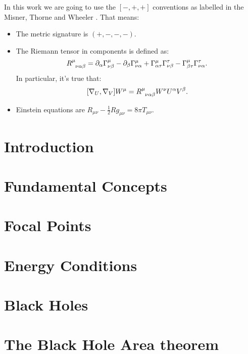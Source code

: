 \documentclass[12pt, a4paper]{book}
\begin{document}
In this work we are going to use the \([-, + , +]\) conventions as labelled in the Misner, Thorne and Wheeler \cite{misner1973gravitation}. That means:
\begin{itemize}
	\item[\ding{99}] The metric signature is \((+, -, -, -)\).
	\item[\ding{99}]  The Riemann tensor in components is defined as:
	\[
	R\indices{^{\mu}_{\nu\alpha\beta}} = \partial_{\alpha}\Gamma^{\mu}_{\nu\beta} - \partial_{\beta}\Gamma^{\mu}_{\nu\alpha} + \Gamma^{\mu}_{\alpha\tau}\Gamma^{\tau}_{\nu\beta} - \Gamma^{\mu}_{\beta\tau}\Gamma^{\tau}_{\nu\alpha}.
	\]
	In particular, it's true that:
	\[
	[\nabla_U, \nabla_V] W^{\mu} = R\indices{^{\mu}_{\nu\alpha\beta}}W^{\nu}U^{\alpha}V^{\beta}.
	\]
	\item[\ding{99}]  Einstein equations are \(R_{\mu\nu} - \frac{1}{2}Rg_{\mu\nu} = 8\pi T_{\mu\nu}\).
\end{itemize}

\chapter*{Introduction}


\chapter{Fundamental Concepts}


\chapter{Focal Points}
\label{ch:focal-points}


\chapter{Energy Conditions}
\label{ch:energy-conditions}


\chapter{Black Holes}


\chapter{The Black Hole Area theorem}

\end{document}
